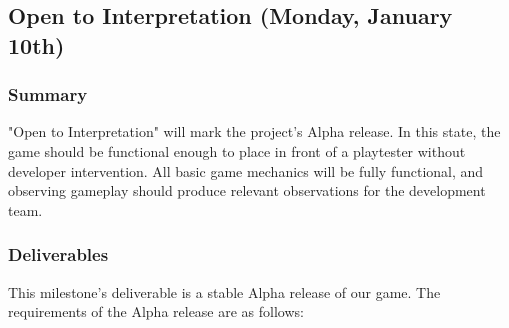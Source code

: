 \subsection{Open to Interpretation (Monday, January 10th)}

\subsubsection*{Summary}
"Open to Interpretation" will mark the project's Alpha release. In this state, the game should be functional enough to place in front of a playtester without developer intervention. All basic game mechanics will be fully functional, and observing gameplay should produce relevant observations for the development team.

\subsubsection*{Deliverables}
This milestone’s deliverable is a stable Alpha release of our game. The requirements of the Alpha release are as follows:

